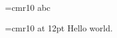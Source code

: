 \documentclass{article}
\begin{document}
\font\y=cmr10 \y abc

\def\foo{[AA]}\afterassignment\foo\font\x=cmr10 at 12pt
{\x Hello} world.
\end{document}
